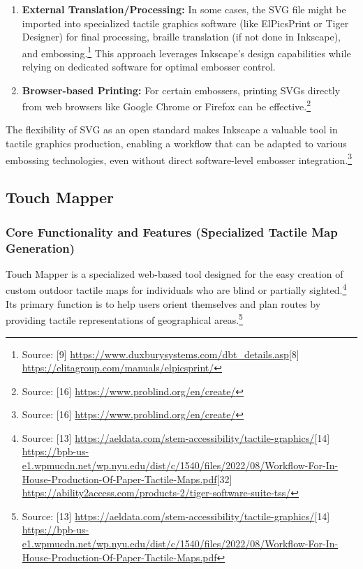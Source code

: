 \begin{enumerate}
\begin{itemize}
        \item The workflow may involve duplicating layers for color and black-and-white versions for combined tactile and visual prints.\footnote{Source: [26] \url{https://www.duxburysystems.org/documentation/NimPro/quick.htm}}
    \end{itemize}
    \item \textbf{External Translation/Processing:} In some cases, the SVG file might be imported into specialized tactile graphics software (like ElPicsPrint or Tiger Designer) for final processing, braille translation (if not done in Inkscape), and embossing.\footnote{Source: [9] \url{https://www.duxburysystems.com/dbt_details.asp}[8] \url{https://elitagroup.com/manuals/elpicsprint/}} This approach leverages Inkscape's design capabilities while relying on dedicated software for optimal embosser control.
    \item \textbf{Browser-based Printing:} For certain embossers, printing SVGs directly from web browsers like Google Chrome or Firefox can be effective.\footnote{Source: [16] \url{https://www.problind.org/en/create/}}
\end{enumerate}

The flexibility of SVG as an open standard makes Inkscape a valuable tool in tactile graphics production, enabling a workflow that can be adapted to various embossing technologies, even without direct software-level embosser integration.\footnote{Source: [16] \url{https://www.problind.org/en/create/}}

\subsection{Touch Mapper}

\subsubsection{Core Functionality and Features (Specialized Tactile Map Generation)}

Touch Mapper is a specialized web-based tool designed for the easy creation of custom outdoor tactile maps for individuals who are blind or partially sighted.\footnote{Source: [13] \url{https://aeldata.com/stem-accessibility/tactile-graphics/}[14] \url{https://bpb-us-e1.wpmucdn.net/wp.nyu.edu/dist/c/1540/files/2022/08/Workflow-For-In-House-Production-Of-Paper-Tactile-Maps.pdf}[32] \url{https://ability2access.com/products-2/tiger-software-suite-tss/}} Its primary function is to help users orient themselves and plan routes by providing tactile representations of geographical areas.\footnote{Source: [13] \url{https://aeldata.com/stem-accessibility/tactile-graphics/}[14] \url{https://bpb-us-e1.wpmucdn.net/wp.nyu.edu/dist/c/1540/files/2022/08/Workflow-For-In-House-Production-Of-Paper-Tactile-Maps.pdf}}


